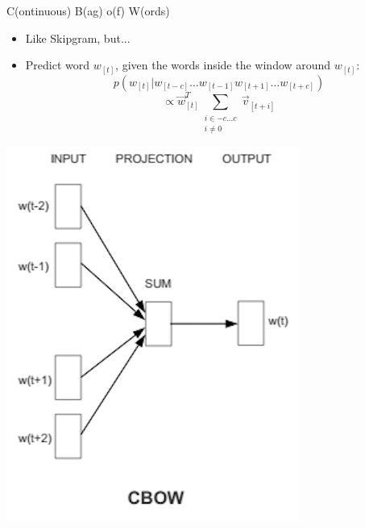 \begin{vbframe}{C(ontinuous) B(ag) o(f) W(ords)}

\vfill

\begin{minipage}{.58\textwidth}
\begin{itemize}
	\item Like Skipgram, but...
	\item Predict word $w_{[t]}$, given the words inside the window around $w_{[t]}$:
	 $$p(w_{[t]}|w_{[t-c]} \ldots w_{[t-1]} w_{[t+1]} \ldots w_{[t+c]})$$
	 $$\propto \vec w_{[t]}^T \sum_{\substack{i \in {-c\ldots c} \\ i \neq 0}} \vec v_{[t+i]}$$
\end{itemize}
\end{minipage}
\begin{minipage}{.41\textwidth}
\begin{center}
\includegraphics[scale=0.99]{figure/cbow}
\end{center}
\end{minipage}

\vfill

\end{vbframe}



